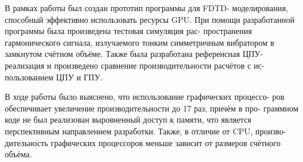 
В рамках работы был создан прототип программы для FDTD-
моделирования, способный эффективно использовать ресурсы GPU. При
помощи разработанной программы была произведена тестовая симуляция рас-
пространения гармонического сигнала, излучаемого тонким симметричным
вибратором в замкнутом счётном объёме. Также была разработана референсная
ЦПУ-реализация и произведено сравнение производительности расчётов с ис-
пользованием ЦПУ и ГПУ.

В ходе работы было выяснено, что использование графических процессо-
ров обеспечивает увеличение производительности до 17 раз, причём в про-
граммном коде не был реализован выровненный доступ к памяти, что является
перспективным направлением разработки. Также, в отличие от CPU, произво-
дительность графических процессоров меньше зависит от размеров счётного
объёма.

\clearpage
